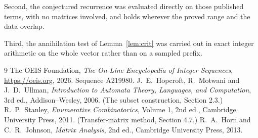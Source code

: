 \documentclass[11pt,a4paper]{article}
\theoremstyle{plain}
\theoremstyle{definition}
\begin{document}
Second, the conjectured recurrence was evaluated directly on those published terms, with no
matrices involved, and holds wherever the proved range and the data overlap.

Third, the annihilation test of Lemma~\ref{lem:crit} was carried out in exact integer
arithmetic on the whole vector rather than on a sampled prefix.

\begin{thebibliography}{9}
 The OEIS Foundation, \emph{The On-Line Encyclopedia of Integer
Sequences}, \url{https://oeis.org}, 2026. Sequence A219980.
 J.~E.~Hopcroft, R.~Motwani and J.~D.~Ullman, \emph{Introduction to Automata
Theory, Languages, and Computation}, 3rd ed., Addison--Wesley, 2006. (The subset
construction, Section 2.3.)
 R.~P.~Stanley, \emph{Enumerative Combinatorics}, Volume 1, 2nd ed.,
Cambridge University Press, 2011. (Transfer-matrix method, Section 4.7.)
 R.~A.~Horn and C.~R.~Johnson, \emph{Matrix Analysis}, 2nd ed., Cambridge
University Press, 2013.
\end{thebibliography}
\end{document}
